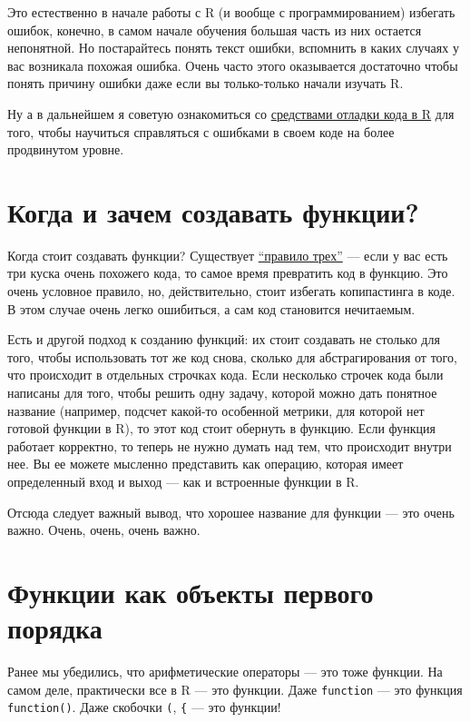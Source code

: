 \documentclass[]{book}
\begin{document}
Это естественно в начале работы с R (и вообще с программированием)
избегать ошибок, конечно, в самом начале обучения большая часть из них
остается непонятной. Но постарайтесь понять текст ошибки, вспомнить в
каких случаях у вас возникала похожая ошибка. Очень часто этого
оказывается достаточно чтобы понять причину ошибки даже если вы
только-только начали изучать R.

Ну а в дальнейшем я советую ознакомиться со
\href{https://adv-r.hadley.nz/debugging.html}{средствами отладки кода в
R} для того, чтобы научиться справляться с ошибками в своем коде на
более продвинутом уровне.

\section{Когда и зачем создавать функции?}\label{why_functions}

Когда стоит создавать функции? Существует
\href{https://en.wikipedia.org/wiki/Rule_of_three_(computer_programming)}{``правило
трех''} --- если у вас есть три куска очень похожего кода, то самое
время превратить код в функцию. Это очень условное правило, но,
действительно, стоит избегать копипастинга в коде. В этом случае очень
легко ошибиться, а сам код становится нечитаемым.

Есть и другой подход к созданию функций: их стоит создавать не столько
для того, чтобы использовать тот же код снова, сколько для
абстрагирования от того, что происходит в отдельных строчках кода. Если
несколько строчек кода были написаны для того, чтобы решить одну задачу,
которой можно дать понятное название (например, подсчет какой-то
особенной метрики, для которой нет готовой функции в R), то этот код
стоит обернуть в функцию. Если функция работает корректно, то теперь не
нужно думать над тем, что происходит внутри нее. Вы ее можете мысленно
представить как операцию, которая имеет определенный вход и выход ---
как и встроенные функции в R.

Отсюда следует важный вывод, что хорошее название для функции --- это
очень важно. Очень, очень, очень важно.

\section{Функции как объекты первого порядка}\label{functions_objects}

Ранее мы убедились, что арифметические операторы --- это тоже функции.
На самом деле, практически все в R --- это функции. Даже
\texttt{function} --- это функция \texttt{function()}. Даже скобочки
\texttt{(}, \texttt{\{} --- это функции!
\end{document}
